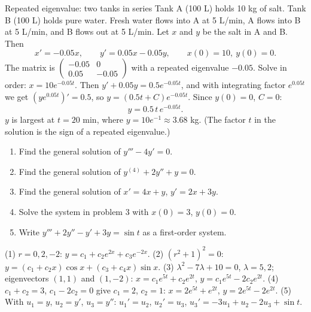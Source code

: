\begin{examplebox}{Repeated eigenvalue: two tanks in series}
Tank A (100 L) holds 10 kg of salt. Tank B (100 L) holds pure water. Fresh water flows into A at 5 L/min, A flows into B at 5 L/min, and B flows out at 5 L/min. Let $x$ and $y$ be the salt in A and B. Then
\[ x' = -0.05x, \qquad y' = 0.05x - 0.05y, \qquad x(0)=10,\ y(0)=0 . \]
The matrix is $\begin{pmatrix}-0.05&0\\0.05&-0.05\end{pmatrix}$ with a repeated eigenvalue $-0.05$. Solve in order:
$x = 10e^{-0.05t}$. Then $y' + 0.05y = 0.5e^{-0.05t}$, and with integrating factor $e^{0.05t}$ we get $(ye^{0.05t})' = 0.5$, so $y = (0.5t + C)e^{-0.05t}$. Since $y(0)=0$, $C=0$:
\[ y = 0.5\,t\,e^{-0.05t}. \]
$y$ is largest at $t = 20$ min, where $y = 10e^{-1}\approx 3.68$ kg. (The factor $t$ in the solution is the sign of a repeated eigenvalue.)
\end{examplebox}

\begin{practicebox}
\begin{enumerate}
  \item Find the general solution of $y''' - 4y' = 0$.
  \item Find the general solution of $y^{(4)} + 2y'' + y = 0$.
  \item Find the general solution of $x' = 4x + y$, \; $y' = 2x + 3y$.
  \item Solve the system in problem 3 with $x(0) = 3$, $y(0)=0$.
  \item Write $y''' + 2y'' - y' + 3y = \sin t$ as a first-order system.
\end{enumerate}
\end{practicebox}

\begin{answerbox}
(1) $r = 0, 2, -2$: $y = c_1 + c_2e^{2x} + c_3e^{-2x}$. \quad (2) $(r^2+1)^2 = 0$: $y = (c_1 + c_2x)\cos x + (c_3 + c_4x)\sin x$. \quad (3) $\lambda^2 - 7\lambda + 10 = 0$, $\lambda = 5, 2$; eigenvectors $(1,1)$ and $(1,-2)$: $x = c_1e^{5t} + c_2e^{2t}$, $y = c_1e^{5t} - 2c_2e^{2t}$. \quad (4) $c_1 + c_2 = 3$, $c_1 - 2c_2 = 0$ give $c_1 = 2$, $c_2 = 1$: $x = 2e^{5t} + e^{2t}$, $y = 2e^{5t} - 2e^{2t}$. \quad (5) With $u_1=y$, $u_2=y'$, $u_3=y''$: $u_1' = u_2$, $u_2' = u_3$, $u_3' = -3u_1 + u_2 - 2u_3 + \sin t$.
\end{answerbox}
